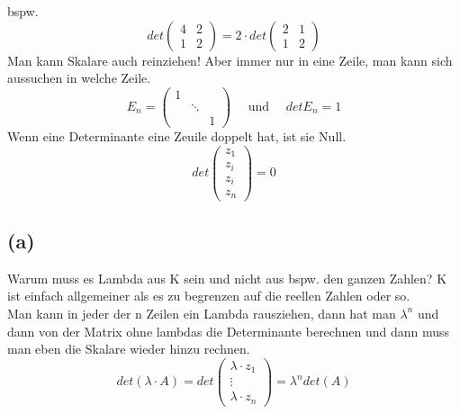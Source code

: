 \documentclass{article} %
\begin{document}
bspw. 
\begin{equation*}
    det \begin{pmatrix}
        4 & 2 \\ 1 & 2
    \end{pmatrix} =  2 \cdot det \begin{pmatrix}
       2 & 1 \\ 1 & 2
    \end{pmatrix} 
\end{equation*}
Man kann Skalare auch reinziehen! Aber immer nur in eine Zeile, man kann sich aussuchen in welche Zeile. 
\begin{equation*}
    E_n = \begin{pmatrix}
       1 \\
       & \ddots \\
       & & 1
    \end{pmatrix}  \quad \text{ und } \quad 
    det E_n = 1
\end{equation*}
Wenn eine Determinante eine Zeuile doppelt hat, ist sie Null. 
\begin{equation*}
    det \begin{pmatrix}
       z_1 \\
       z_i \\
       z_i \\
       z_n
    \end{pmatrix} = 0
\end{equation*}

\subsection{(a)}
Warum muss es Lambda aus K sein und nicht aus bspw. den ganzen Zahlen? K ist einfach allgemeiner als es zu begrenzen auf die reellen Zahlen oder so. \\
Man kann in jeder der n Zeilen ein Lambda rausziehen, dann hat man $\lambda^n$ und dann von der Matrix ohne lambdas die Determinante berechnen und dann muss man eben die Skalare wieder hinzu rechnen. 
\[
det(\lambda \cdot A) = det \begin{pmatrix}
\lambda \cdot z_1 \\
\vdots \\
\lambda \cdot z_n
\end{pmatrix} = \lambda^n det (A)
\]
\end{document}

